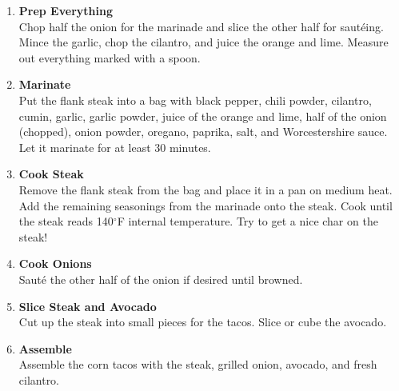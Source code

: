 \begin{enumerate}

      \item \textbf{Prep Everything} \\
            Chop half the onion for the marinade and slice the other half for sautéing. Mince the garlic, chop the cilantro, and juice the orange and lime. Measure out everything marked with a spoon.

      \item \textbf{Marinate} \\
            Put the flank steak into a bag with black pepper, chili powder, cilantro, cumin, garlic, garlic powder, juice of the orange and lime, half of the onion (chopped), onion powder, oregano, paprika, salt, and Worcestershire sauce. Let it marinate for at least 30 minutes.

      \item \textbf{Cook Steak} \\
            Remove the flank steak from the bag and place it in a pan on medium heat. Add the remaining seasonings from the marinade onto the steak. Cook until the steak reads 140$^\circ$F internal temperature. Try to get a nice char on the steak!

      \item \textbf{Cook Onions} \\
            Sauté the other half of the onion if desired until browned.

      \item \textbf{Slice Steak and Avocado} \\
            Cut up the steak into small pieces for the tacos. Slice or cube the avocado.

      \item \textbf{Assemble} \\
            Assemble the corn tacos with the steak, grilled onion, avocado, and fresh cilantro.

\end{enumerate}


